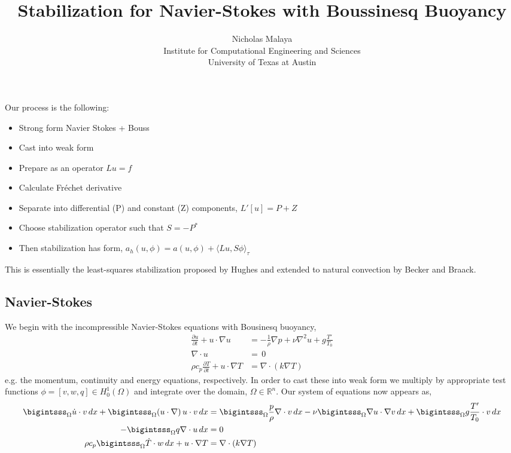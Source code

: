 \documentclass{article}
\title{\bf{Stabilization for Navier-Stokes with Boussinesq Buoyancy}}
\author{Nicholas Malaya \\ Institute for Computational Engineering and Sciences \\ University of Texas at Austin} \date{}
\begin{document}
\maketitle

%
%
Our process is the following: 

\begin{itemize}
 \item Strong form Navier Stokes + Bouss
 \item Cast into weak form
 \item Prepare as an operator $Lu=f$
 \item Calculate Fr\'echet derivative
 \item Separate into differential (P) and constant (Z) components,
       $L'[u] = P + Z$
 \item Choose stabilization operator such that $S = -P^*$
 \item Then stabilization has form, $a_h(u,\phi) = a(u,\phi) + \langle
       Lu,S\phi \rangle_\tau$
\end{itemize}

This is essentially the least-squares stabilization proposed by Hughes
and extended to natural convection by Becker and Braack. 

%
%
\newpage

\subsection{Navier-Stokes}

We begin with the incompressible Navier-Stokes equations with Bousinesq
buoyancy,
\begin{align}
 \frac{\partial u}{\partial t} + u \cdot \nabla u &= -\frac{1}{\rho}
 \nabla p + \nu \nabla^2 u + g \frac{T'}{T_0} \\
 \nabla \cdot u &= \, 0 \\
 \rho c_p \frac{\partial T}{\partial t} + u \cdot \nabla T &= \nabla
 \cdot (k \nabla T)
\end{align}
e.g. the momentum, continuity and energy equations, respectively. In
order to cast these into weak form we multiply by appropriate test
functions $\phi = \left[v,w,q\right] \in H^1_0(\Omega)$ and integrate over
the domain, $\Omega \in \mathbb{R}^n$. Our system of equations now
appears as, 
\begin{align}
 \bigintsss_\Omega \dot u \cdot v \, dx +
 \bigintsss_\Omega  (u \cdot \nabla) \, u \cdot v \, dx &=
 \bigintsss_\Omega \frac{p}{\rho} \nabla \cdot v \, dx - \nu \bigintsss_\Omega \nabla u \cdot \nabla v
 \,dx + \bigintsss_\Omega g \frac{T'}{T_0} \cdot v \, dx \\ 
 - \bigintsss_\Omega q \nabla \cdot u \, dx &= 0 \\
 \rho c_p \bigintsss_\Omega \dot T \cdot w \, dx + u \cdot \nabla T &= \nabla
 \cdot (k \nabla T) 
\end{align}
\end{document}
